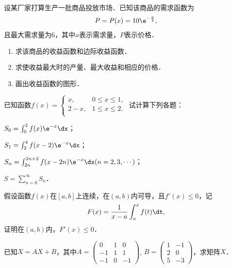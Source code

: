 \documentclass[plain,noanswer,medmath]{../../template/jnuexam}
\begin{document}
\begin{problem}
设某厂家打算生产一批商品投放市场．已知该商品的需求函数为
$$P=P(x)=10\e^{-\frac{x}{2}},$$
且最大需求量为$6$，其中$x$表示需求量，$P$表示价格．
\begin{enumerate}
\item 求该商品的收益函数和边际收益函数．%
\item 求使收益最大时的产量、最大收益和相应的价格．%
\item 画出收益函数的图形．%
\end{enumerate}
\end{problem}



\begin{problem}
已知函数$f(x)=\begin{cases}
    x, & 0\le x\le 1, \\
  2-x, & 1\le x\le 2. \\
\end{cases}$ 试计算下列各题：\par
\begin{enumerate*}[itemjoin=\relax]
\item $S_0=\int_0^2f(x)\e^{-x}\dx$；\hspace*{1em}%
\item $S_1=\int_2^4f(x-2)\e^{-x}\dx$；\\%
\item $S_n=\int_{2n}^{2n+2}f(x-2n)\e^{-x}\dx(n=2,3,\cdots)$；\hspace*{1em}%
\item $S=\sum_{n=0}^{\infty}S_n$．%
\end{enumerate*}
\end{problem}



\begin{problem}
假设函数$f(x)$在$[a,b]$上连续，在$(a,b)$内可导，且$f'(x)\le 0$，记
$$F(x)=\frac{1}{x-a}\int_a^x f(t)\dt,$$
证明在$(a,b)$内，$F'(x)\le 0$．
\end{problem}



\begin{problem}
已知$X=AX+B$，其中$A=\begin{pmatrix}
   0 & 1 & 0 \\
  -1 & 1 & 1 \\
  -1 & 0 & -1
\end{pmatrix}$, $B=\begin{pmatrix}
  1 & -1 \\
  2 & 0 \\
  5 & -3
\end{pmatrix}$，求矩阵$X$．
\end{problem}
\end{document}
